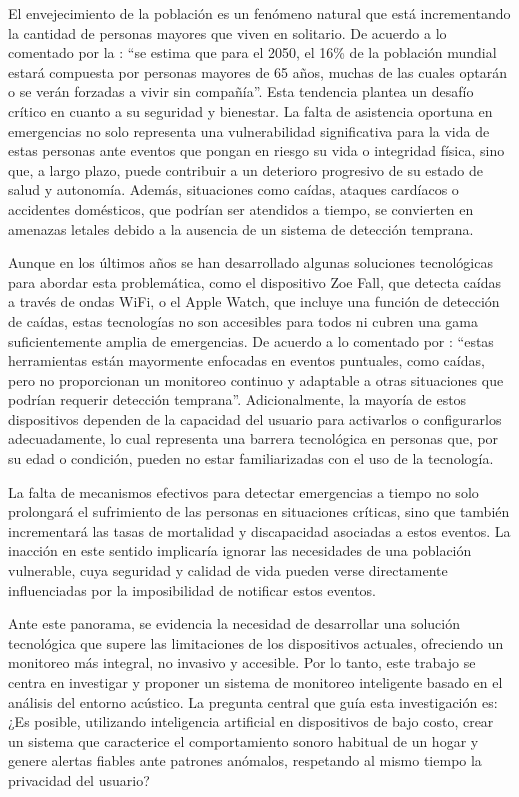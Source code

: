 El envejecimiento de la población es un fenómeno natural que está incrementando la cantidad de personas mayores que viven en solitario. De acuerdo a lo comentado por la \citeauthor{naciones_unidas_envejecimiento_2022} \citeyear{naciones_unidas_envejecimiento_2022}: ``se estima que para el 2050, el 16\% de la población mundial estará compuesta por personas mayores de 65 años, muchas de las cuales optarán o se verán forzadas a vivir sin compañía''. Esta tendencia plantea un desafío crítico en cuanto a su seguridad y bienestar. La falta de asistencia oportuna en emergencias no solo representa una vulnerabilidad significativa para la vida de estas personas ante eventos que pongan en riesgo su vida o integridad física, sino que, a largo plazo, puede contribuir a un deterioro progresivo de su estado de salud y autonomía. Además, situaciones como caídas, ataques cardíacos o accidentes domésticos, que podrían ser atendidos a tiempo, se convierten en amenazas letales debido a la ausencia de un sistema de detección temprana.

Aunque en los últimos años se han desarrollado algunas soluciones tecnológicas para abordar esta problemática, como el dispositivo Zoe Fall, que detecta caídas a través de ondas WiFi, o el Apple Watch, que incluye una función de detección de caídas, estas tecnologías no son accesibles para todos ni cubren una gama suficientemente amplia de emergencias. De acuerdo a lo comentado por \citeauthor{carmona_enchufe_2024} \citeyear{carmona_enchufe_2024}: ``estas herramientas están mayormente enfocadas en eventos puntuales, como caídas, pero no proporcionan un monitoreo continuo y adaptable a otras situaciones que podrían requerir detección temprana''. Adicionalmente, la mayoría de estos dispositivos dependen de la capacidad del usuario para activarlos o configurarlos adecuadamente, lo cual representa una barrera tecnológica en personas que, por su edad o condición, pueden no estar familiarizadas con el uso de la tecnología.

La falta de mecanismos efectivos para detectar emergencias a tiempo no solo prolongará el sufrimiento de las personas en situaciones críticas, sino que también incrementará las tasas de mortalidad y discapacidad asociadas a estos eventos. La inacción en este sentido implicaría ignorar las necesidades de una población vulnerable, cuya seguridad y calidad de vida pueden verse directamente influenciadas por la imposibilidad de notificar estos eventos.

Ante este panorama, se evidencia la necesidad de desarrollar una solución tecnológica que supere las limitaciones de los dispositivos actuales, ofreciendo un monitoreo más integral, no invasivo y accesible. Por lo tanto, este trabajo se centra en investigar y proponer un sistema de monitoreo inteligente basado en el análisis del entorno acústico. La pregunta central que guía esta investigación es: ¿Es posible, utilizando inteligencia artificial en dispositivos de bajo costo, crear un sistema que caracterice el comportamiento sonoro habitual de un hogar y genere alertas fiables ante patrones anómalos, respetando al mismo tiempo la privacidad del usuario?

